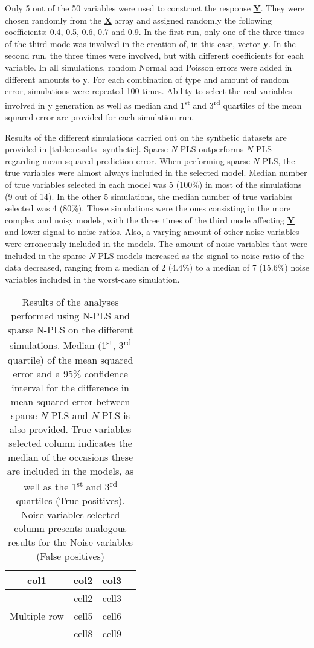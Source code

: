 Only 5 out of the 50 variables were used to construct the response \textbf{\underline{Y}}. They were chosen randomly from the \textbf{\underline{X}} array and assigned randomly the following coefficients: 0.4, 0.5, 0.6, 0.7 and 0.9. In the first run, only one of the three times of the third mode was involved in the creation of, in this case, vector \textbf{y}. In the second run, the three times were involved, but with different coefficients for each variable. In all simulations, random Normal and Poisson errors were added in different amounts to \textbf{y}. For each combination of type and amount of random error, simulations were repeated 100 times. Ability to select the real variables involved in y generation as well as median and 1\textsuperscript{st} and 3\textsuperscript{rd} quartiles of the mean squared error are provided for each simulation run.

Results of the different simulations carried out on the synthetic datasets are provided in \autoref{table:results_synthetic}. Sparse $N$-PLS outperforms $N$-PLS regarding mean squared prediction error. When performing sparse $N$-PLS, the true variables were almost always included in the selected model. Median number of true variables selected in each model was 5 (100\%) in most of the simulations (9 out of 14). In the other 5 simulations, the median number of true variables selected was 4 (80\%). These simulations were the ones consisting in the more complex and noisy models, with the three times of the third mode affecting \textbf{\underline{Y}} and lower signal-to-noise ratios. Also, a varying amount of other noise variables were erroneously included in the models. The amount of noise variables that were included in the sparse $N$-PLS models increased as the signal-to-noise ratio of the data decreased, ranging from a median of 2 (4.4\%) to a median of 7 (15.6\%) noise variables included in the worst-case simulation.

\begin{table}[h!]
\begin{tabular}{ |c|c|c|c| } 
\hline
col1 & col2 & col3 \\
\hline
\multirow{3}{4em}{Multiple row} & cell2 & cell3 \\ 
& cell5 & cell6 \\ 
& cell8 & cell9 \\ 
\hline
\end{tabular}
\caption{Results of the analyses performed using N-PLS and sparse N-PLS on the different simulations. Median (1\textsuperscript{st}, 3\textsuperscript{rd} quartile) of the mean squared error and a 95\% confidence interval for the difference in mean squared error between sparse $N$-PLS and $N$-PLS is also provided. True variables selected column indicates the median of the occasions these are included in the models, as well as the 1\textsuperscript{st} and 3\textsuperscript{rd} quartiles (True positives). Noise variables selected column presents analogous results for the Noise variables (False positives)}
\label{table:results_synthetic}
\end{table}


